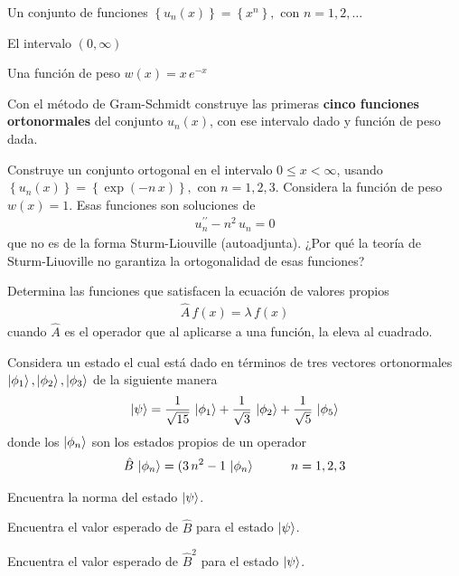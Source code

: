 \begin{milista}
\begin{milista}
\item Un conjunto de funciones $\left\{ u_{n} (x) \right\} = \left\{ x^{n} \right\}, \mbox{ con } n = 1, 2, \ldots$
\item El intervalo $(0, \infty)$
\item Una función de peso $w(x) = x \, e^{-x}$
\end{milista}
Con el método de Gram-Schmidt construye las primeras \textbf{cinco funciones ortonormales} del conjunto $u_{n}(x)$, con ese intervalo dado y función de peso dada.
\item Construye un conjunto ortogonal en el intervalo $0 \leq x < \infty$, usando $\left\{ u_{n}(x) \right\} = \left\{ \exp(-n \, x) \right\}, \mbox{ con } n = 1, 2, 3$. Considera la función de peso $w(x) = 1$. Esas funciones son soluciones de
\begin{align*}
u_{n}^{\prime \prime} - n^{2} \, u_{n} = 0
\end{align*}
que no es de la forma Sturm-Liouville (autoadjunta). ¿Por qué la teoría de Sturm-Liuoville no garantiza la ortogonalidad de esas funciones?
\item Determina las funciones que satisfacen la ecuación de valores propios
\begin{align*}
\hat{A} \, f(x) = \lambda \, f(x)
\end{align*}
cuando $\hat{A}$ es el operador que al aplicarse a una función, la eleva al cuadrado.
\item Considera un estado el cual está dado en términos de tres vectores ortonormales $\ket{\phi_{1}}, \ket{\phi_{2}}, \ket{\phi_{3}}$ de la siguiente manera
\begin{align*}
\ket{\psi} = \dfrac{1}{\sqrt{15}} \, \ket{\phi_{1}} + \dfrac{1}{\sqrt{3}} \, \ket{\phi_{2}} + \dfrac{1}{\sqrt{5}} \, \ket{\phi_{5}}
\end{align*}
donde los $\ket{\phi_{n}}$ son los estados propios de un operador 
\begin{align*}
\hat{B} \, \ket{\phi_{n}} = (3 \, n^{2} - 1 \, \ket{\phi_{n}} \hspace{1cm} n = 1, 2, 3
\end{align*}
\begin{milista}
\item Encuentra la norma del estado $\ket{\psi}$.
\item Encuentra el valor esperado de $\hat{B}$ para el estado $\ket{\psi}$.
\item Encuentra el valor esperado de $\hat{B}^{2}$ para el estado $\ket{\psi}$.
\end{milista}

\end{milista}
